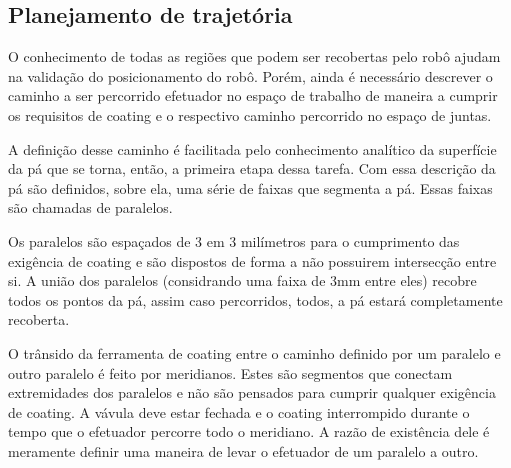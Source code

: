 \subsection{Planejamento de trajetória}

O conhecimento de todas as regiões que podem ser recobertas pelo robô ajudam na
validação do posicionamento do robô. Porém, ainda é necessário descrever o
caminho a ser percorrido efetuador no espaço de trabalho de maneira a cumprir os
requisitos de coating e o respectivo caminho percorrido no espaço de juntas.

A definição desse caminho é facilitada pelo conhecimento analítico da superfície
da pá que se torna, então, a primeira etapa dessa tarefa. Com essa descrição da
pá são definidos, sobre ela, uma série de faixas que segmenta a pá. Essas
faixas são chamadas de paralelos.

Os paralelos são espaçados de 3 em 3 milímetros para o cumprimento das exigência
de coating e são dispostos de forma a não possuirem intersecção entre si. A
união dos paralelos (considrando uma faixa de 3mm entre eles) recobre todos os
pontos da pá, assim caso percorridos, todos, a pá estará completamente
recoberta.  

O trânsido da ferramenta de coating entre o caminho definido por um
paralelo e outro paralelo é feito por meridianos. Estes são segmentos que
conectam extremidades dos paralelos e não são pensados para cumprir qualquer
exigência de coating. A vávula deve estar fechada e o coating interrompido
durante o tempo que o efetuador percorre todo o meridiano. A razão de existência
dele é meramente definir uma maneira de levar o efetuador de um paralelo a
outro.



